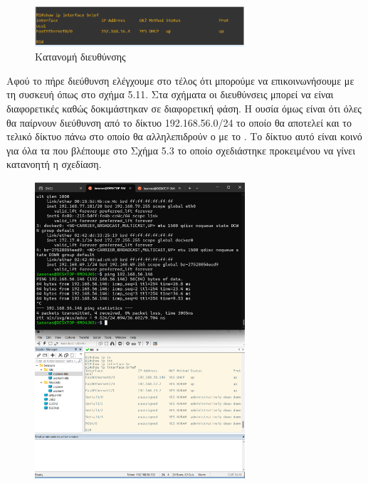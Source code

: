 \FloatBarrier

\begin{figure}[htb]
	\centering
	\includegraphics[width=0.7\textwidth]{graphics/cisco_ip_address.png}
	\caption{Κατανομή  διευθύνσης}
\end{figure}

\FloatBarrier


\noindent Αφού το  πήρε  διεύθυνση ελέγχουμε στο τέλος ότι μπορούμε να επικοινωνήσουμε με τη συσκευή όπως στο σχήμα 5.11. Στα σχήματα οι  διευθύνσεις μπορεί να είναι διαφορετικές καθώς δοκιμάστηκαν σε διαφορετική φάση. Η ουσία όμως είναι ότι όλες θα παίρνουν  διεύθυνση από το δίκτυο 192.168.56.0/24 το οποίο θα αποτελεί και το τελικό δίκτυο πάνω στο οποίο θα αλληλεπιδρούν ο  με το . Το δίκτυο αυτό είναι κοινό για όλα τα  που βλέπουμε στο Σχήμα 5.3 το οποίο σχεδιάστηκε προκειμένου να γίνει κατανοητή η σχεδίαση.

\FloatBarrier

\begin{figure}[htb]
	\centering
	\includegraphics[width=0.7\textwidth]{graphics/ip_connectivity_test.png}
	\caption{}
\end{figure}

